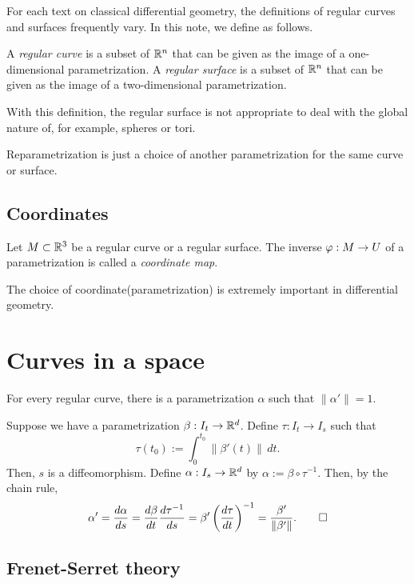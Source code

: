 \documentclass{../exp}
\def\a{\alpha}
\begin{document}
For each text on classical differential geometry, the definitions of regular curves and surfaces frequently vary.
In this note, we define as follows.
\begin{defn}
A \emph{regular curve} is a subset of $\mathbb{R}^n$ that can be given as the image of a one-dimensional parametrization.
A \emph{regular surface} is a subset of $\mathbb{R}^n$ that can be given as the image of a two-dimensional parametrization.
\end{defn}
With this definition, the regular surface is not appropriate to deal with the global nature of, for example, spheres or tori.

Reparametrization is just a choice of another parametrization for the same curve or surface.



\subsection{Coordinates}
\begin{defn}
Let $M\subset\mathbb{R}^3$ be a regular curve or a regular surface.
The inverse $\f:M\to U$ of a parametrization is called a \emph{coordinate map}.
\end{defn}


The choice of coordinate(parametrization) is extremely important in differential geometry.




\section{Curves in a space}
\begin{thm}
For every regular curve, there is a parametrization $\a$ such that $\|\a'\|=1$.
\end{thm}
\begin{pf}
Suppose we have a parametrization $\beta:I_t\to\R^d$.
Define $\tau:I_t\to I_s$ such that
\[\tau(t_0):=\int_0^{t_0}\|\beta'(t)\|\,dt.\]
Then, $s$ is a diffeomorphism.
Define $\a:I_s\to\R^d$ by $\a:=\beta\circ\tau^{-1}$.
Then, by the chain rule,
\[\a'=\dd{\a}{s}=\dd{\beta}{t}\dd{\tau^{-1}}{s}=\beta'\left(\dd{\tau}{t}\right)^{-1}=\frac{\beta'}{\|\beta'\|}.\qedhere\]
\end{pf}



\subsection{Frenet-Serret theory}
\end{document}

